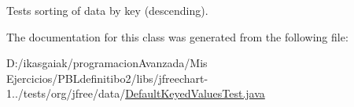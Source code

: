 Tests sorting of data by key (descending). 

The documentation for this class was generated from the following file\+:\begin{DoxyCompactItemize}
\item 
D\+:/ikasgaiak/programacion\+Avanzada/\+Mis Ejercicios/\+P\+B\+Ldefinitibo2/libs/jfreechart-\/1../tests/org/jfree/data/\mbox{\hyperlink{_default_keyed_values_test_8java}{Default\+Keyed\+Values\+Test.\+java}}\end{DoxyCompactItemize}
